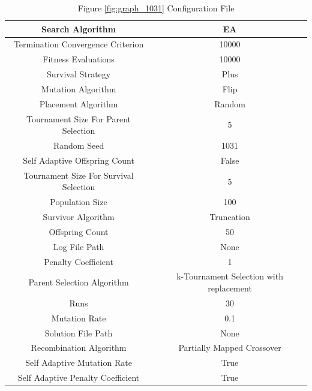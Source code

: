 \documentclass{standalone}
\begin{document}
\clearpage
\begin{table}[!htb]
	\centering
	\caption{Figure \ref{fig:graph_1031} Configuration File}
	\label{tab:graph_1031}
	\begin{tabular}{| c | c |}
		\hline
		Search Algorithm		& EA		 \\
		\hline
		Termination Convergence Criterion		& 10000		 \\
		\hline
		Fitness Evaluations		& 10000		 \\
		\hline
		Survival Strategy		& Plus		 \\
		\hline
		Mutation Algorithm		& Flip		 \\
		\hline
		Placement Algorithm		& Random		 \\
		\hline
		Tournament Size For Parent Selection		& 5		 \\
		\hline
		Random Seed		& 1031		 \\
		\hline
		Self Adaptive Offspring Count		& False		 \\
		\hline
		Tournament Size For Survival Selection		& 5		 \\
		\hline
		Population Size		& 100		 \\
		\hline
		Survivor Algorithm		& Truncation		 \\
		\hline
		Offspring Count		& 50		 \\
		\hline
		Log File Path		& None		 \\
		\hline
		Penalty Coefficient		& 1		 \\
		\hline
		Parent Selection Algorithm		& k-Tournament Selection with replacement		 \\
		\hline
		Runs		& 30		 \\
		\hline
		Mutation Rate		& 0.1		 \\
		\hline
		Solution File Path		& None		 \\
		\hline
		Recombination Algorithm		& Partially Mapped Crossover		 \\
		\hline
		Self Adaptive Mutation Rate		& True		 \\
		\hline
		Self Adaptive Penalty Coefficient		& True		 \\
		\hline
	\end{tabular}
\end{table}
\end{document}
